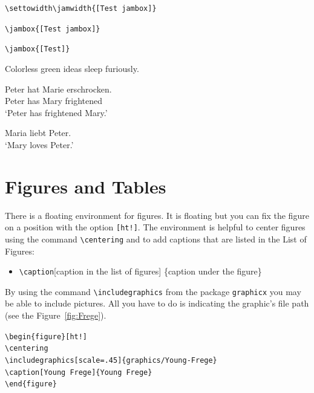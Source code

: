 \medskip

\noindent \verb|\settowidth\jamwidth{[Test jambox]}|

\smallskip

\verb||	\jambox{[Test jambox]}

\verb|\jambox{[Test]}|	\jambox{[Test]}

\medskip

\settowidth{}
\ea Colorless green ideas sleep furiously. 

\ex 
\gll Peter hat Marie erschrocken. \\
Peter has Mary frightened\\ 
\glt `Peter has frightened Mary.' 

\ex
\gll Maria liebt Peter.\\
`Mary loves Peter.'\\ 
\z


\section{Figures and Tables}
\label{ch:FigTab}


There is a floating environment for figures. It is floating but you can fix the figure on a position with the option \texttt{[ht!]}. The environment is helpful to center figures using the command \texttt{\textbackslash centering} and to add captions that are listed in the List of Figures:

\begin{itemize}
	\item[] \texttt{\textbackslash caption}[caption in the list of figures] \{caption under the figure\}
\end{itemize}

By using the command \texttt{\textbackslash includegraphics} from the package \texttt{graphicx} you may be able to include pictures. All you have to do is indicating the graphic's file path (see the Figure~\ref{fig:Frege}).

\bigskip

{	\footnotesize
\noindent \texttt{\textbackslash begin\{figure\}[ht!]\\
	\textbackslash centering\\
	\textbackslash includegraphics[scale=.45]\{graphics/Young-Frege\} \\
	\textbackslash caption[Young Frege]\{Young Frege\} \\
	\textbackslash end\{figure\} }
}

